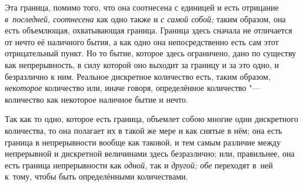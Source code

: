 Эта граница, помимо того, что она соотнесена с единицей и есть отрицание
{\em в~последней, соотнесена} как одно также и {\em с самой собой;} таким
образом, она есть объемлющая, охватывающая граница. Граница здесь сначала не
отличается от нечто её наличного бытия, а как одно она непосредственно
есть сам этот отрицательный пункт. Но то бытие, которое здесь ограничено, дано
по существу как непрерывность, в силу которой оно выходит за границу и за это
одно, и безразлично к ним. Реальное дискретное количество есть, таким образом,
{\em некоторое} количество или, иначе говоря, определённое количество "---
количество как некоторое наличное бытие и нечто.

Так как то одно, которое есть граница, объемлет собою многие одни дискретного
количества, то она полагает их в такой же мере и как снятые в нём; она есть
граница в непрерывности вообще как таковой, и тем самым различие между
непрерывной и дискретной величинами здесь безразлично; или, правильнее, она
есть граница непрерывности как {\em одной,} так и {\em другой; обе} переходят
в~ней к~тому, чтобы быть определёнными количествами.

\bigskip
